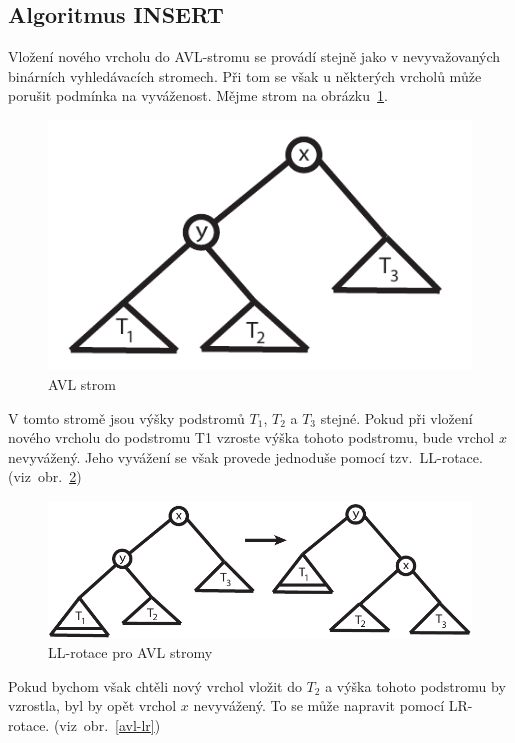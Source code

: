 \subsection{Algoritmus INSERT}

Vložení nového vrcholu do AVL-stromu se provádí stejně jako v
nevyvažovaných binárních vyhledávacích stromech. Při tom se však u
některých vrcholů může porušit podmínka na vyváženost. Mějme 
strom na obrázku~\ref{avltree}.

\begin{figure}[!htb]
\centering\includegraphics{pics/avl}
\caption{AVL strom}
\label{avltree}
\end{figure}

V tomto stromě jsou výšky podstromů $T_1$, $T_2$ a $T_3$ stejné. 
Pokud při vložení
nového vrcholu do podstromu T1 vzroste výška tohoto podstromu, bude vrchol
$x$ nevyvážený. Jeho vyvážení se však provede jednoduše pomocí 
tzv.~LL-rotace. (viz~obr.~\ref{avl-ll})

\begin{figure}[!htb]
\centering\includegraphics{pics/avl-ll}
\caption{LL-rotace pro AVL stromy}
\label{avl-ll}
\end{figure}

Pokud bychom však chtěli nový vrchol vložit do $T_2$ a výška tohoto podstromu
by vzrostla, byl by opět vrchol $x$ nevyvážený. To se může napravit pomocí
LR-rotace. (viz~obr.~\ref{avl-lr})

